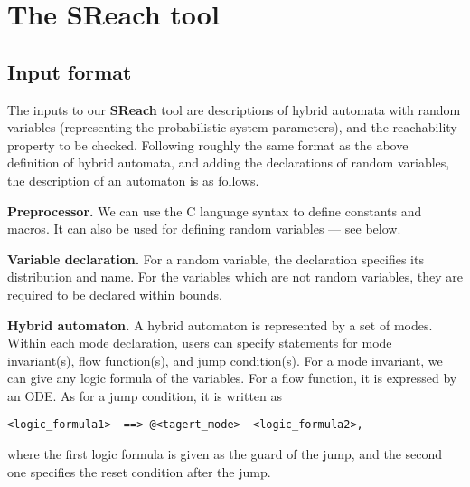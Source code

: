 \section{The SReach tool}\label{apndx:usage}
\subsection{Input format}
The inputs to our {\bf SReach} tool are descriptions of hybrid automata with random variables (representing the probabilistic system parameters), and the reachability property to be checked. Following roughly the same format as the above definition of hybrid automata, and adding the declarations of random variables, 
the description of an automaton is as follows.

{\bf Preprocessor.} We can use the C language syntax to define constants and macros. It can also be used
for defining random variables --- see below.

\begin{comment}
For example, we can write,\\

$\#define\;\; x \;\;2.0$\\
$\#define\;\; y\;\; (z^2 \;+\; 1)$\\

where $z$ can be a random variable.\\
\end{comment}

{\bf Variable declaration.} For a random variable, the declaration specifies its distribution and name. For the variables which are not random variables, they are required to be declared within bounds. 
\begin{comment}
with the format - $Dist \; \; var_nam;$, where currently "$Dist$" can be "$B(p)$" (Bernoulli distribution), "$U(p, \;q)$" (Uniform distribution), "$N(p, \;q)$" (Gaussian distribution), and "$E(p)$" (Exponential distribution). $p$ and $q$ are parameters for these distributions. (Note: it is easy to include additional distributions if needed.)

For instance,\\
$[-10, \; 20.1]\; \;  x;$\\
\end{comment}

{\bf Hybrid automaton.} A hybrid automaton is represented by a set of modes. Within each mode declaration, users can specify statements for mode invariant(s), flow function(s), and jump condition(s). For a mode invariant, we can give any logic formula of the variables. For a flow function, it is expressed by an ODE.  As for a jump condition, it is written as 
\begin{verbatim} 
<logic_formula1>  ==> @<tagert_mode>  <logic_formula2>,
\end{verbatim}
where the first logic formula is given as the guard of the jump, and the second one specifies the reset condition after the jump.

